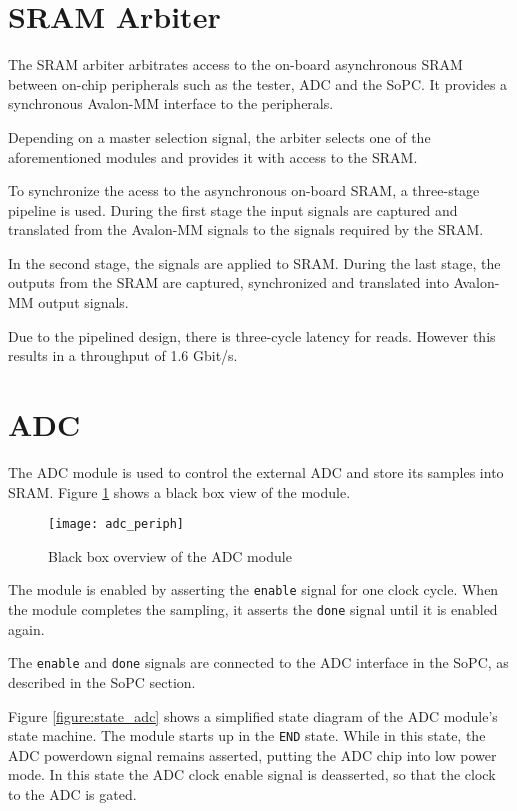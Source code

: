 \newpage
\section{SRAM Arbiter}

The SRAM arbiter arbitrates access to the on-board asynchronous SRAM between on-chip peripherals such as the tester, ADC and the SoPC. It provides
a synchronous Avalon-MM interface to the peripherals.

Depending on a master selection signal, the arbiter selects one of the aforementioned modules and provides it with access to the SRAM.

To synchronize the acess to the asynchronous on-board SRAM, a three-stage pipeline is used. During the first stage
the input signals are captured and translated from the Avalon-MM signals to the signals required by the SRAM.

In the second stage, the signals are applied to SRAM. During the last stage, the outputs from the SRAM are captured, synchronized and translated
into Avalon-MM output signals.

Due to the pipelined design, there is three-cycle latency for reads. However this results in a throughput of 1.6 Gbit/s.


\newpage
\section{ADC}
The ADC module is used to control the external ADC and store its samples into SRAM.
Figure \ref{figure:adc_blackbox} shows a black box view of the module.
\begin{figure}[h!]
\begin{center}
\texttt{[image: adc\_periph]}
\caption{Black box overview of the ADC module}
\label{figure:adc_blackbox}
\end{center}
\end{figure}

The module is enabled by asserting the \texttt{enable} signal for one clock cycle. When
the module completes the sampling, it asserts the \texttt{done} signal until it is enabled
again.

The \texttt{enable} and \texttt{done} signals are connected to the ADC interface
in the SoPC, as described in the SoPC section.


Figure \ref{figure:state_adc} shows a simplified state diagram of the ADC module's state
machine. The module starts up in the \texttt{END} state. While in this state, the
ADC powerdown signal remains asserted, putting the ADC chip into low power mode. In this
state the ADC clock enable signal is deasserted, so that the clock to the ADC is gated.

